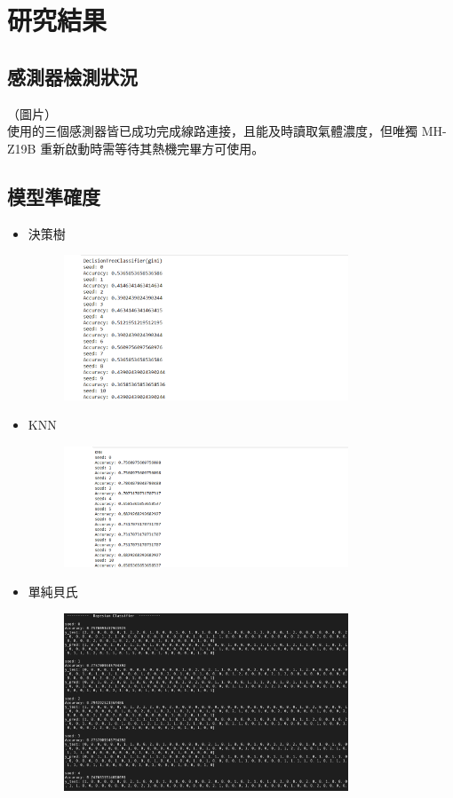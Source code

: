 \chapter{研究結果}

\section{感測器檢測狀況}
（圖片）\\
使用的三個感測器皆已成功完成線路連接，且能及時讀取氣體濃度，但唯獨 MH-Z19B 重新啟動時需等待其熱機完畢方可使用。

\section{模型準確度}
\begin{itemize}
	\item 決策樹\\
	\begin{figure}[H]
		\centering
		\includegraphics[width=0.8\textwidth]{../../pic/decisiontree.png}
	\end{figure}
	\item KNN\\
	\begin{figure}[H]
		\centering
		\includegraphics[width=0.8\textwidth]{../../pic/knn.png}
	\end{figure}
	\item 單純貝氏\\
	\begin{figure}[H]
		\centering
		\includegraphics[width=0.8\textwidth]{../../pic/Bayesian.png}

\end{figure}
\end{itemize}

